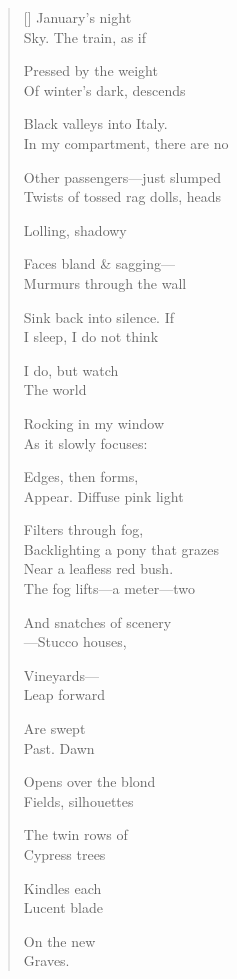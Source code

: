 \begin{verse}[\versewidth]
January's night\\
Sky. The train, as if

Pressed by the weight\\
Of winter's dark, descends

Black valleys into Italy.\\
In my compartment, there are no

Other passengers---just slumped\\
Twists of tossed rag dolls, heads

Lolling, shadowy

Faces bland \& sagging---\\
Murmurs through the wall

Sink back into silence. \qquad If\\
I sleep, I do not think

I do, but watch\\
The world

Rocking in my window\\
As it slowly focuses:

Edges, then forms,\\
Appear. Diffuse pink light

Filters through fog,\\
Backlighting a pony that grazes\\

Near a leafless red bush.\\
The fog lifts---a meter---two

And snatches of scenery\\
---Stucco houses,

Vineyards---\\
Leap forward

Are swept\\
Past. \qquad Dawn

Opens over the blond\\
Fields, silhouettes

The twin rows of\\
Cypress trees

Kindles each\\
Lucent blade

On the new\\
Graves.
\end{verse}
